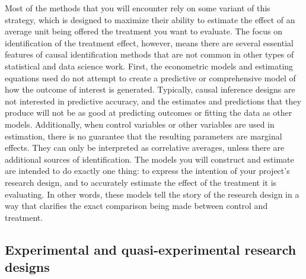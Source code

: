Most of the methods that you will encounter rely on some variant of this strategy,
which is designed to maximize their ability to estimate the effect
of an average unit being offered the treatment you want to evaluate.
The focus on identification of the treatment effect, however,
means there are several essential features of causal identification methods
that are not common in other types of statistical and data science work.
First, the econometric models and estimating equations used
do not attempt to create a predictive or comprehensive model
of how the outcome of interest is generated.
Typically, causal inference designs are not interested in predictive accuracy,
and the estimates and predictions that they produce
will not be as good at predicting outcomes or fitting the data as other models.
Additionally, when control variables or other variables are used in estimation,
there is no guarantee that the resulting parameters are marginal effects.
They can only be interpreted as correlative averages,
unless there are additional sources of identification.
The models you will construct and estimate are intended to do exactly one thing:
to express the intention of your project's research design,
and to accurately estimate the effect of the treatment it is evaluating.
In other words, these models tell the story of the research design
in a way that clarifies the exact comparison being made between control and treatment.

\subsection{Experimental and quasi-experimental research designs}

